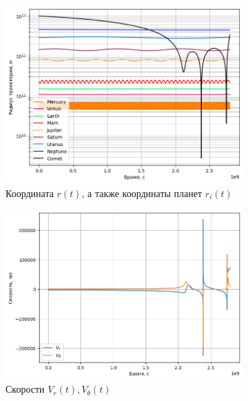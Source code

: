 \begin{figure}[H]
    \centering
    \begin{subfigure}{0.49\linewidth}
        \centering
		\includegraphics[width=1\linewidth]{imgs_8/rOutside.png}
		\caption{Координата $r(t)$, а также координаты планет $r_i(t)$}
	\end{subfigure}
	\begin{subfigure}{0.49\linewidth}
        \centering
		\includegraphics[width=1\linewidth]{imgs_8/vOutside.png}
		\caption{Скорости $V_r(t), V_\theta(t)$}
	\end{subfigure}
	\begin{subfigure}{0.49\linewidth}
        \centering

\end{subfigure}
\end{figure}
